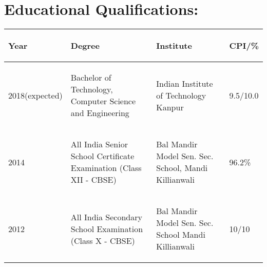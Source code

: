 \documentclass{cv}
\begin{document}


\section*{Educational Qualifications:}
\begin{center}
\begin{tabular}{ | m{2.4cm} | m{6.5cm} | m{5.7cm} | m{1.2cm}| } 
 \hline
 \begin{center} \textbf{Year} \end{center} 
 & \begin{center} \textbf{Degree} \end{center} 
 & \begin{center} \textbf{Institute} \end{center} 
 & \begin{center} \textbf{CPI/\%} \end{center} \\ 
 \hline
 \begin{center} 2018(expected) \end{center}
  & \begin{center} Bachelor of Technology, Computer Science and Engineering \end{center}
  & \begin{center} Indian Institute of Technology Kanpur \end{center} 
  & 9.5/10.0 \\
 \hline 
 \begin{center} 2014 \end{center} 
 & \begin{center} All India Senior School Certificate Examination (Class XII - CBSE) \end{center} 
 & \begin{center} Bal Mandir Model Sen. Sec. School, Mandi Killianwali \end{center} 
 & \begin{center} 96.2\% \end{center} \\
 \hline
 \begin{center} 2012 \end{center} 
 & \begin{center} All India Secondary School Examination (Class X - CBSE) \end{center} 
 & \begin{center} Bal Mandir Model Sen. Sec. School Mandi Killianwali \end{center} 
 & \begin{center} 10/10 \end{center} \\
 \hline
\end{tabular}
\end{center}
\end{document}
